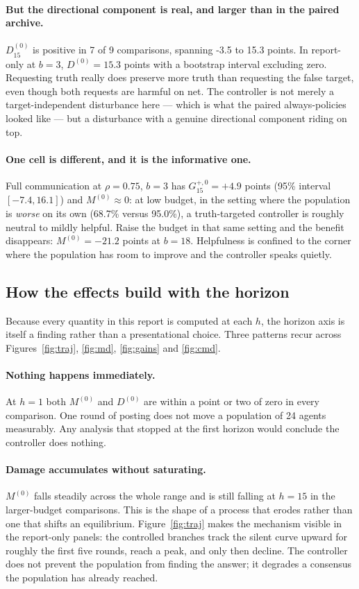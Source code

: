 \documentclass[11pt]{article}
\begin{document}
\paragraph{But the directional component is real, and larger than in the paired archive.}
$D^{(0)}_{15}$ is positive in 7 of 9 comparisons, spanning
-3.5 to 15.3 points. In report-only at $b=3$, $D^{(0)}=15.3$ points
with a bootstrap interval excluding zero. Requesting truth really does preserve more truth
than requesting the false target, even though both requests are harmful on net. The
controller is not merely a target-independent disturbance here --- which is what the
paired always-policies looked like --- but a disturbance with a genuine directional
component riding on top.

\paragraph{One cell is different, and it is the informative one.}
Full communication at $\rho=0.75$, $b=3$ has $G^{+,0}_{15}=+4.9$ points
(95\% interval $[-7.4, 16.1]$) and $M^{(0)}\approx0$: at low
budget, in the setting where the population is \emph{worse} on its own
(68.7\% versus 95.0\%), a truth-targeted controller is roughly neutral
to mildly helpful. Raise the budget in that same setting and the benefit disappears:
$M^{(0)}=-21.2$ points at $b=18$. Helpfulness is confined to the corner where the
population has room to improve and the controller speaks quietly.

\subsection{How the effects build with the horizon}\label{sec:horizon}
Because every quantity in this report is computed at each $h$, the horizon axis is itself a
finding rather than a presentational choice. Three patterns recur across
Figures~\ref{fig:traj}, \ref{fig:md}, \ref{fig:gains} and \ref{fig:cmd}.

\paragraph{Nothing happens immediately.} At $h=1$ both $M^{(0)}$ and $D^{(0)}$ are within a
point or two of zero in every comparison. One round of posting does not move a population of
24 agents measurably. Any analysis that stopped at the first horizon would conclude the
controller does nothing.

\paragraph{Damage accumulates without saturating.} $M^{(0)}$ falls steadily across the whole
range and is still falling at $h=15$ in the larger-budget comparisons. This is the shape
of a process that erodes rather than one that shifts an equilibrium. Figure~\ref{fig:traj}
makes the mechanism visible in the report-only panels: the controlled branches track the
silent curve upward for roughly the first five rounds, reach a peak, and only then decline.
The controller does not prevent the population from finding the answer; it degrades a
consensus the population has already reached.
\end{document}
